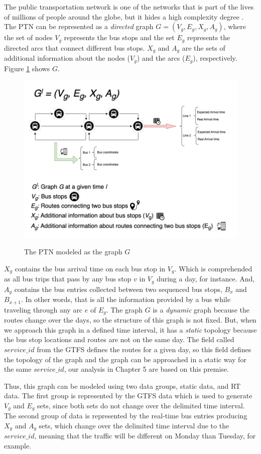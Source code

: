 The public transportation network is one of the networks that is 
part of the lives of millions of people around the globe, but it 
hides a high complexity degree \cite{ferber2012}.
The PTN can be represented as a {\em directed} graph $G=(V_g,E_g,X_g,A_g)$,
where the set of nodes $V_g$ represents the bus stops and
the set $E_g$ represents the directed arcs that connect different bus stops.
$X_g$ and $A_g$ are the sets of additional information about the nodes 
($V_g$) and the arcs ($E_g$), respectively. Figure \ref{img:2:2} shows $G$. 

    \begin{figure}[H]
     \centering
        \caption{The PTN modeled as the graph $G$}
        \includegraphics[scale=0.5]{imagem/cap2/final_graph.png}
        \label{img:2:2}
    \end{figure}

$X_g$ contains the bus arrival time on each bus stop in $V_g$. Which is
comprehended as all bus trips that pass by any bus stop $v$ in $V_g$
during a day, for instance. And,
$A_g$ contains the bus entries collected between two sequenced bus stops, $B_x$ and 
$B_{x+1}$. In other words, that is all the information provided by a bus while
traveling through any arc $e$ of $E_g$.
The graph $G$ is a {\em dynamic} graph because the routes change over the days, so the structure of this graph is not fixed.
But, when we approach this graph in a defined time interval, it has a {\em static} topology because the bus stop locations and routes
are not on the same day. The field called $service\_id$ from the GTFS defines the routes for a given day, so this field defines
the topology of the graph and the graph can be approached in a static way for the same $service\_id$, our analysis in Chapter 5 are based on this premise.

Thus, this graph can be
modeled using two data groups, static data, and RT data.
The first group is represented by the GTFS data which is used to generate $V_g$ and
$E_g$ sets, since both sets do not change over the delimited time interval. The second group of data is represented by the real-time bus entries producing $X_g$ and $A_g$ sets, which change over the delimited time interval due to the $service\_id$, meaning
that the traffic will be different on Monday than Tuesday, for example. 

